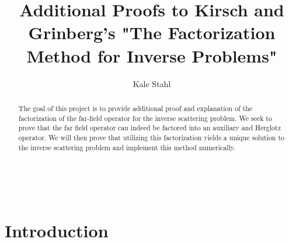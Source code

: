 \documentclass[]{article}
\title{Additional Proofs to Kirsch and Grinberg's  "The Factorization Method for Inverse Problems"}
\date{}
\author{Kale Stahl}
\newcommand{\bd}{\textbf}
\begin{document}
		\makeatletter
		\begin{center}
			{\centering \Large \bd \@title}\\
			\vspace{.5cm}
			{\large \@author}
			\vspace{.25cm}
		\end{center}
		\makeatother
		\begin{abstract}
			The goal of this project is to provide additional proof and explanation of the factorization of the far-field operator for the inverse scattering problem. We seek to prove that the far field operator can indeed be factored into an auxiliary and Herglotz operator. We will then prove that utilizing this factorization yields a unique solution to the inverse scattering problem and implement this method numerically.
		\end{abstract}
		\section{Introduction}		
\end{document}
